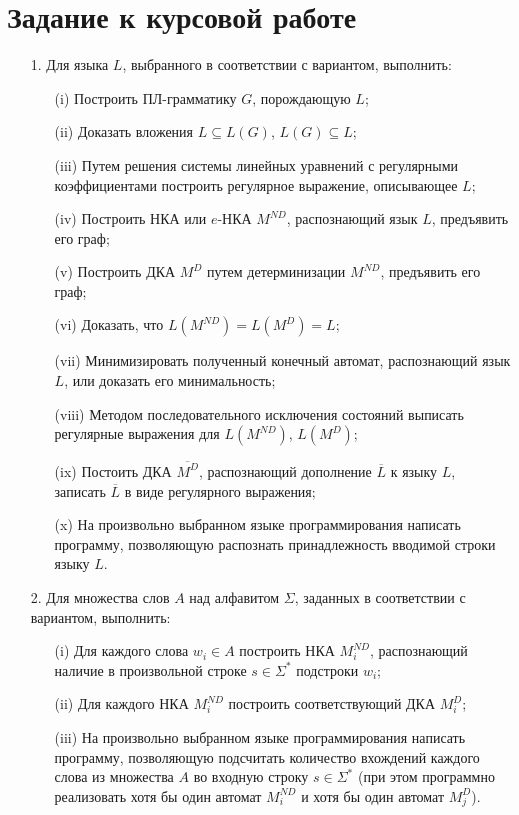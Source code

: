 \renewcommand{\theAlgoEnv}{\Alph{chapter}.\arabic{AlgoEnv}}

\chapter{Задание к курсовой работе}
\begin{itemize}
\item[1.] Для языка $L$, выбранного в соответствии с вариантом, выполнить:
\begin{itemize}
\item[(i)] Построить ПЛ-грамматику $G$, порождающую $L$;
\item[(ii)] Доказать вложения $L\subseteq L(G)$, $L(G)\subseteq L$;
\item[(iii)] Путем решения системы линейных уравнений с регулярными коэффициентами построить регулярное выражение, описывающее $L$;
\item[(iv)] Построить НКА или $e$-НКА $M^{ND}$, распознающий язык $L$, предъявить его граф;
\item[(v)] Построить ДКА $M^{D}$ путем детерминизации $M^{ND}$, предъявить его граф;
\item[(vi)] Доказать, что $L(M^{ND})=L(M^{D})=L$;
\item[(vii)] Минимизировать полученный конечный автомат, распознающий язык $L$, или доказать его минимальность;
\item[(viii)] Методом последовательного исключения состояний выписать регулярные выражения для $L(M^{ND})$, $L(M^{D})$;
\item[(ix)] Постоить ДКА $\overline{M^D}$, распознающий дополнение $\overline{L}$ к языку $L$, записать $\overline{L}$ в виде регулярного выражения;
\item[(x)] На произвольно выбранном языке программирования написать программу, позволяющую распознать принадлежность вводимой строки языку $L$.
\end{itemize}

\item[2.] Для множества слов $A$ над алфавитом $\Sigma$, заданных в соответствии с вариантом, выполнить:
\begin{itemize}
\item[(i)] Для каждого слова $w_i\in A$ построить НКА $M^{ND}_i$, распознающий наличие в произвольной строке $s\in\Sigma^\ast$ подстроки $w_i$;
\item[(ii)] Для каждого НКА $M^{ND}_i$ построить соответствующий ДКА $M^D_i$;
\item[(iii)] На произвольно выбранном языке программирования написать программу, позволяющую подсчитать количество вхождений каждого слова из множества $A$ во входную строку $s\in\Sigma^\ast$ (при этом программно реализовать хотя бы один автомат $M^{ND}_i$ и хотя бы один автомат $M^D_j$).
\end{itemize}


\end{itemize}

